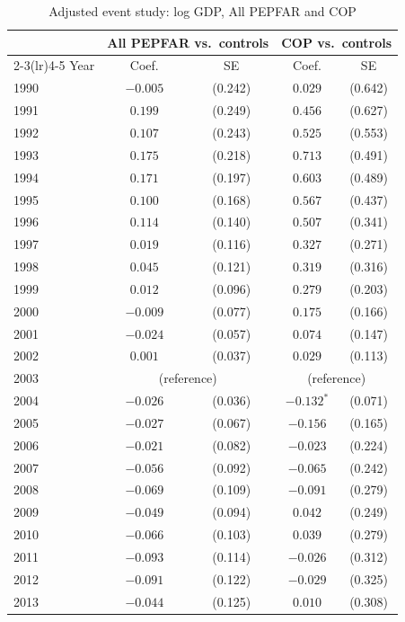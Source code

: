 \begin{table}[htbp]
\centering
\small
\caption{Adjusted event study: log GDP, All PEPFAR and COP}
\label{tab:es_combined_log_gdp}
\begin{tabular}{lcccc}
\toprule
 & \multicolumn{2}{c}{All PEPFAR vs.\ controls} & \multicolumn{2}{c}{COP vs.\ controls} \\
\cmidrule(lr){2-3}\cmidrule(lr){4-5}
Year & Coef. & SE & Coef. & SE \\
\midrule
1990 & $-0.005$ & (0.242) & $0.029$ & (0.642) \\
1991 & $0.199$ & (0.249) & $0.456$ & (0.627) \\
1992 & $0.107$ & (0.243) & $0.525$ & (0.553) \\
1993 & $0.175$ & (0.218) & $0.713$ & (0.491) \\
1994 & $0.171$ & (0.197) & $0.603$ & (0.489) \\
1995 & $0.100$ & (0.168) & $0.567$ & (0.437) \\
1996 & $0.114$ & (0.140) & $0.507$ & (0.341) \\
1997 & $0.019$ & (0.116) & $0.327$ & (0.271) \\
1998 & $0.045$ & (0.121) & $0.319$ & (0.316) \\
1999 & $0.012$ & (0.096) & $0.279$ & (0.203) \\
2000 & $-0.009$ & (0.077) & $0.175$ & (0.166) \\
2001 & $-0.024$ & (0.057) & $0.074$ & (0.147) \\
2002 & $0.001$ & (0.037) & $0.029$ & (0.113) \\
2003 & \multicolumn{2}{c}{(reference)} & \multicolumn{2}{c}{(reference)} \\
2004 & $-0.026$ & (0.036) & $-0.132^{*}$ & (0.071) \\
2005 & $-0.027$ & (0.067) & $-0.156$ & (0.165) \\
2006 & $-0.021$ & (0.082) & $-0.023$ & (0.224) \\
2007 & $-0.056$ & (0.092) & $-0.065$ & (0.242) \\
2008 & $-0.069$ & (0.109) & $-0.091$ & (0.279) \\
2009 & $-0.049$ & (0.094) & $0.042$ & (0.249) \\
2010 & $-0.066$ & (0.103) & $0.039$ & (0.279) \\
2011 & $-0.093$ & (0.114) & $-0.026$ & (0.312) \\
2012 & $-0.091$ & (0.122) & $-0.029$ & (0.325) \\
2013 & $-0.044$ & (0.125) & $0.010$ & (0.308) \\

\end{tabular}
\end{table}
